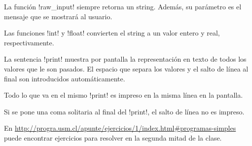 \documentclass[10pt]{article}
\begin{document}

  La función \li!raw_input! siempre retorna un string.
  Además, su parámetro es el mensaje que se mostrará al usuario.

  Las funciones \li!int! y \li!float!
  convierten el string a un valor entero y real,
  respectivamente.


  La sentencia \li!print! muestra por pantalla
  la representación en texto
  de todos los valores que le son pasados.
  El espacio que separa los valores
  y el salto de línea al final
  son introducidos automáticamente.

  Todo lo que va en el mismo \li!print!
  es impreso en la misma línea en la pantalla.

  Si se pone una coma solitaria al final del \li!print!,
  el salto de línea no es impreso.

  En \url{http://progra.usm.cl/apunte/ejercicios/1/index.html#programas-simples}
  puede encontrar ejercicios para resolver en la segunda mitad de la clase.
  
\end{document}
